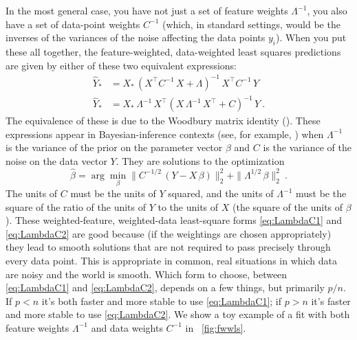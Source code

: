\documentclass[12pt,letterpaper]{article}
\begin{document}
In the most general case, you have not just a set of feature weights $\Lambda^{-1}$, you also have a set of data-point weights $C^{-1}$ (which, in standard settings, would be the inverses of the variances of the noise affecting the data points $y_i$).
When you put these all together, the feature-weighted, data-weighted least squares predictions are given by either of these two equivalent expressions:
\begin{align}\label{eq:LambdaC1}
    \hat{Y}_\ast &= X_\ast\,(X^\top C^{-1}\,X + \Lambda)^{-1}\,X^\top C^{-1}\,Y
    \\ \label{eq:LambdaC2}
    \hat{Y}_\ast &= X_\ast\,\Lambda^{-1}\,X^\top (X\,\Lambda^{-1}\,X^\top + C)^{-1}\,Y
    ~.
\end{align}
The equivalence of these is due to the Woodbury matrix identity (\citealt{henderson1981deriving}). These expressions appear in Bayesian-inference contexts (see, for example, \citealt{products}) when $\Lambda^{-1}$ is the variance of the prior on the parameter vector $\beta$ and $C$ is the variance of the noise on the data vector $Y$.
They are solutions to the optimization
\begin{equation}
    \hat{\beta} = \arg\min_\beta \|C^{-1/2}\,(Y - X\,\beta)\|_2^2 + \|\Lambda^{1/2}\,\beta\|_2^2
    ~.
\end{equation}
The units of $C$ must be the units of $Y$ squared, and the units of $\Lambda^{-1}$ must be the square of the ratio of the units of $Y$ to the units of $X$ (the square of the units of $\beta$). These weighted-feature, weighted-data least-square forms \eqref{eq:LambdaC1} and \eqref{eq:LambdaC2} are good because (if the weightings are chosen appropriately) they lead to smooth solutions that are not required to pass precisely through every data point. This is appropriate in common, real situations in which data are noisy and the world is smooth. Which form to choose, between \eqref{eq:LambdaC1} and \eqref{eq:LambdaC2}, depends on a few things, but primarily $p/n$. If $p<n$ it's both faster and more stable to use \eqref{eq:LambdaC1}; if $p>n$ it's faster and more stable to use \eqref{eq:LambdaC2}. We show a toy example of a fit with both feature weights $\Lambda^{-1}$ and data weights $C^{-1}$ in \figurename~\ref{fig:fwwls}.
\end{document}

